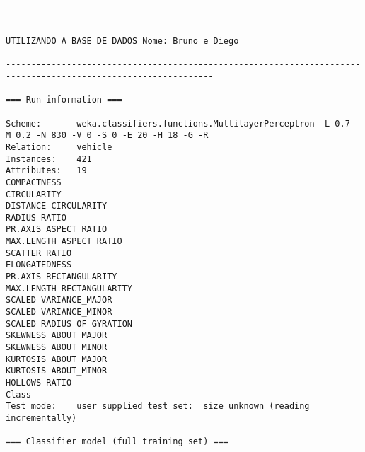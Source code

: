 \documentclass[
	article,			%
	11pt,				%
	oneside,			%
	a4paper,			%
	english,			%
	brazil,				%
	sumario=tradicional
	]{abntex2}
\begin{document}
\begin{lstlisting}
---------------------------------------------------------------------------------------------------------------

UTILIZANDO A BASE DE DADOS Nome: Bruno e Diego

---------------------------------------------------------------------------------------------------------------

=== Run information ===

Scheme:       weka.classifiers.functions.MultilayerPerceptron -L 0.7 -M 0.2 -N 830 -V 0 -S 0 -E 20 -H 18 -G -R
Relation:     vehicle
Instances:    421
Attributes:   19
COMPACTNESS
CIRCULARITY
DISTANCE CIRCULARITY
RADIUS RATIO
PR.AXIS ASPECT RATIO
MAX.LENGTH ASPECT RATIO
SCATTER RATIO
ELONGATEDNESS
PR.AXIS RECTANGULARITY
MAX.LENGTH RECTANGULARITY
SCALED VARIANCE_MAJOR
SCALED VARIANCE_MINOR
SCALED RADIUS OF GYRATION
SKEWNESS ABOUT_MAJOR
SKEWNESS ABOUT_MINOR
KURTOSIS ABOUT_MAJOR
KURTOSIS ABOUT_MINOR
HOLLOWS RATIO
Class
Test mode:    user supplied test set:  size unknown (reading incrementally)

=== Classifier model (full training set) ===


\end{lstlisting}
\end{document}
